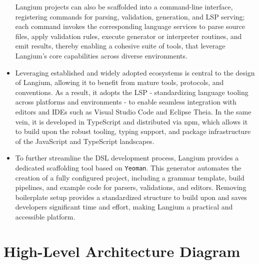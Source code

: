 \begin{multicols}{2}
\begin{itemize}
          Langium projects can also be scaffolded into a command-line interface, registering commands for parsing, validation, generation, and LSP serving; each command invokes the
          corresponding language services to parse source files, apply validation rules, execute generator or interpreter routines, and emit results, thereby enabling a cohesive
          suite of tools, that leverage Langium's core capabilities across diverse environments.
    \item Leveraging established and widely adopted ecosystems is central to the design of Langium, allowing it to benefit from mature tools, protocols, and conventions.
          As a result, it adopts the LSP - standardizing language tooling across platforms and environments - to enable seamless integration with editors and IDEs such as Visual Studio Code and Eclipse Theia.
          In the same vein, it is developed in TypeScript and distributed via npm, which allows it to build upon the robust tooling, typing support, and package infrastructure of the JavaScript and TypeScript landscapes.
    \item To further streamline the DSL development process, Langium provides a dedicated scaffolding tool based on \verb|Yeoman|. This generator automates the creation of a
          fully configured project, including a grammar template, build pipelines, and example code for parsers, validations, and editors. Removing boilerplate setup provides a
          standardized structure to build upon and saves developers significant time and effort, making Langium a practical and accessible platform.
  \end{itemize}
\end{multicols}

\section{High-Level Architecture Diagram}

